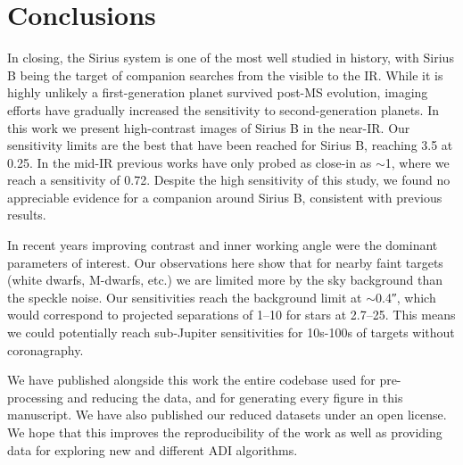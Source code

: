 \documentclass[twocolumn]{aastex631}
\begin{document}
\section{Conclusions} \label{sec:conclusion}

In closing, the Sirius system is one of the most well studied in history, with Sirius B being the target of companion searches from the visible to the IR. While it is highly unlikely a first-generation planet survived post-MS evolution, imaging efforts have gradually increased the sensitivity to second-generation planets. In this work we present high-contrast images of Sirius B in the near-IR. Our sensitivity limits are the best that have been reached for Sirius B, reaching \qty{3.5}{\jupitermass} at \qty{0.25}{\au}. In the mid-IR previous works have only probed as close-in as $\sim$\qty{1}{\au}, where we reach a sensitivity of \qty{0.72}{\jupitermass}. Despite the high sensitivity of this study, we found no appreciable evidence for a companion around Sirius B, consistent with previous results.

In recent years improving contrast and inner working angle were the dominant parameters of interest. Our observations here show that for nearby faint targets (white dwarfs, M-dwarfs, etc.) we are limited more by the sky background than the speckle noise. Our sensitivities reach the background limit at $\sim$\ang{;;0.4}, which would correspond to projected separations of \qtyrange{1}{10}{\au} for stars at \qtyrange{2.7}{25}{\parsec}. This means we could potentially reach sub-Jupiter sensitivities for 10s-100s of targets without coronagraphy.

We have published alongside this work the entire codebase used for pre-processing and reducing the data, and for generating every figure in this manuscript. We have also published our reduced datasets under an open license. We hope that this improves the reproducibility of the work as well as providing data for exploring new and different ADI algorithms.

\begin{acknowledgments}

\end{acknowledgments}


{}

\end{document}
